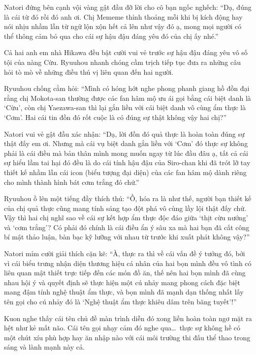 \documentclass[../main.tex]{subfiles}
\begin{document}
Natori đứng bên cạnh vội vàng gật đầu đỡ lời cho cô bạn ngốc nghếch: ``Dạ, đúng là cái từ đó rồi đó anh ơi. Chị Mememe thỉnh thoảng mỗi khi bị kích động hay nói nhịu nhầm lẫn từ ngữ lộn xộn hết cả lên như vậy đó ạ, mong mọi người có thể thông cảm bỏ qua cho cái sự hậu đậu đáng yêu đó của chị ấy nhé.''

Cả hai anh em nhà Hikawa đều bật cười vui vẻ trước sự hậu đậu đáng yêu vô số tội của nàng Cừu. Ryuuhou nhanh chóng cầm trịch tiếp tục đưa ra những câu hỏi tò mò về những điều thú vị liên quan đến hai người.

Ryuuhou chống cằm hỏi: ``Mình có hóng hớt nghe phong phanh giang hồ đồn đại rằng chị Mokota-san thường được các fan hâm mộ ưu ái gọi bằng cái biệt danh là `Cừu', còn chị Yaezawa-san thì lại gắn liền với cái biệt danh vô cùng ẩm thực là `Cơm'. Hai cái tin đồn đó rốt cuộc là có đúng sự thật không vậy hai chị?''

Natori vui vẻ gật đầu xác nhận: ``Dạ, lời đồn đó quả thực là hoàn toàn đúng sự thật đấy em ơi. Nhưng mà cái vụ biệt danh gắn liền với `Cơm' đó thực sự không phải là cái điều mà bản thân mình mong muốn ngay từ lúc đầu đâu ạ, tất cả cái sự hiểu lầm tai hại đó đều là do cái tính hậu đậu của Siro-chan khi đã trót lỡ tay thiết kế nhầm lẫn cái icon (biểu tượng đại diện) của các fan hâm mộ dành riêng cho mình thành hình bát cơm trắng đó chứ.''

Ryuuhou ồ lên một tiếng đầy thích thú: ``Ồ, hóa ra là như thế, người bạn thiết kế của chị quả thực cũng mang tính sáng tạo đột phá vô cùng lầy lội thật đấy chứ. Vậy thì hai chị nghĩ sao về cái sự kết hợp ẩm thực độc đáo giữa `thịt cừu nướng' và `cơm trắng'? Có phải đó chính là cái điều ẩn ý sâu xa mà hai bạn đã cất công bí mật thảo luận, bàn bạc kỹ lưỡng với nhau từ trước khi xuất phát không vậy?''

Natori mỉm cười giải thích cặn kẽ: ``À, thực ra thì về cái vấn đề ý tưởng đó, bởi vì cái biểu trưng nhận diện thương hiệu cá nhân của hai bọn mình đều vô tình có liên quan mật thiết trực tiếp đến các món đồ ăn, thế nên hai bọn mình đã cùng nhau hội ý và quyết định sẽ thực hiện một cú nhảy mang phong cách đặc biệt mang đậm tính nghệ thuật ẩm thực, và bọn mình đã mạnh dạn thống nhất lấy tên gọi cho cú nhảy đó là `Nghệ thuật ẩm thực khiêu dâm trên băng tuyết'!''

Kuon nghe thấy cái tên chủ đề màn trình diễn đó xong liền hoàn toàn ngơ mặt ra hệt như kẻ mất não. Cái tên gọi nhạy cảm đó nghe qua\dots\ thực sự không hề có một chút xíu phù hợp hay ăn nhập nào với cái môi trường thi đấu thể thao trong sáng và lành mạnh này cả.
\end{document}
